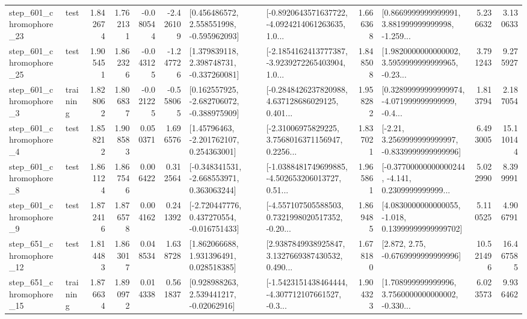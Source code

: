 \begin{tabular}{llrrrrllrlrr}
  step\_601\_chromophore\_23 &      test &      1.842674 &    1.762131 &     -0.080544 & -2.426109 &    [0.456486572, 2.558551998, -0.595962093] &  [-0.8920643571637722, -4.0924214061263635, 1.0... &       1.666368 &  [0.8669999999999991, 3.881999999999998, -1.259... &            5.236632 &          3.130633 \\
  step\_601\_chromophore\_25 &      test &      1.905451 &    1.862326 &     -0.043125 & -1.247726 &    [1.379839118, 2.398748731, -0.337260081] &  [-2.1854162413777387, -3.9239272265403904, 1.0... &       1.848508 &  [1.9820000000000002, 3.5959999999999965, -0.23... &            3.791243 &          9.275927 \\
   step\_601\_chromophore\_3 &  training &      1.828062 &    1.806837 &     -0.021225 & -0.558065 &   [0.162557925, -2.682706072, -0.388975909] &  [-0.2848426237820988, 4.637128686029125, 0.401... &       1.958282 &  [0.32899999999999974, -4.071999999999999, -0.4... &            1.813794 &          2.187054 \\
   step\_601\_chromophore\_4 &      test &      1.858212 &    1.908583 &      0.050371 &  1.696576 &     [1.45796463, -2.201762107, 0.254363001] &  [-2.31006975829225, 3.7568016371156947, 0.2256... &       1.837021 &   [-2.21, 3.2569999999999997, -0.8339999999999996] &            6.493005 &         15.110144 \\
   step\_601\_chromophore\_8 &      test &      1.861124 &    1.867546 &      0.006422 &  0.312564 &   [-0.348341531, -2.668553971, 0.363063244] &  [-1.0388481749699885, -4.502653206013727, 0.51... &       1.965861 &  [-0.37700000000000244, -4.141, 0.2309999999999... &            5.022990 &          8.399991 \\
   step\_601\_chromophore\_9 &      test &      1.872416 &    1.876578 &      0.004162 &  0.241392 &   [-2.720447776, 0.437270554, -0.016751433] &  [-4.557107505588503, 0.7321998020517352, -0.20... &       1.869485 &  [4.0830000000000055, -1.018, 0.13999999999999702] &            5.110525 &          4.906791 \\
  step\_651\_chromophore\_12 &      test &      1.814483 &    1.863017 &      0.048534 &  1.638728 &     [1.862066688, 1.931396491, 0.028518385] &  [2.9387849938925847, 3.1327669387430532, 0.490... &       1.678180 &                 [2.872, 2.75, -0.6769999999999996] &           10.521496 &         16.467585 \\
  step\_651\_chromophore\_15 &  training &      1.876634 &    1.890972 &      0.014338 &  0.561837 &     [0.928988263, 2.539441217, -0.02062916] &  [-1.5423151438464444, -4.307712107661527, -0.3... &       1.904323 &  [1.708999999999996, 3.7560000000000002, -0.330... &            6.023573 &          9.936462 \\

\end{tabular}
